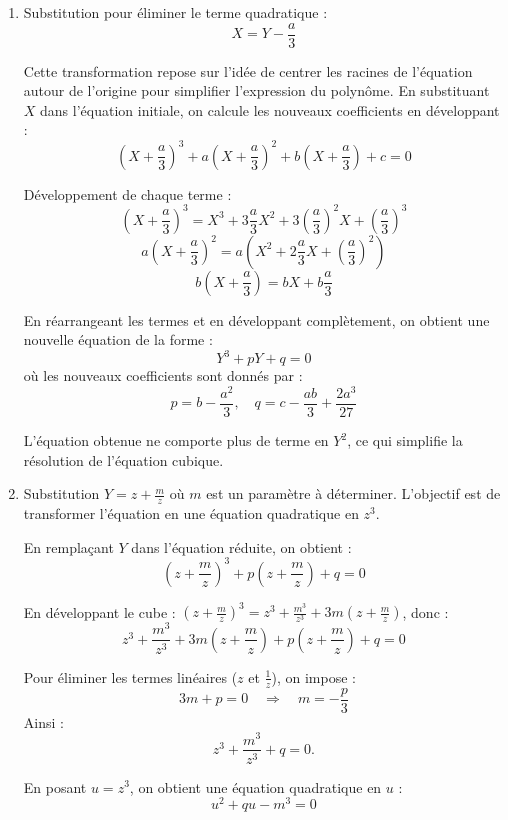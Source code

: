 \documentclass[10pt,a4paper]{article}
\begin{document}
\begin{enumerate}
    \item Substitution pour éliminer le terme quadratique :
    \[
    X = Y - \frac{a}{3}
    \]

    Cette transformation repose sur l'idée de centrer les racines de l'équation autour de l'origine
    pour simplifier l'expression du polynôme. En substituant \( X \) dans l'équation initiale, on
    calcule les nouveaux coefficients en développant :
    \[
    \left(X + \frac{a}{3}\right)^3 + a\left(X + \frac{a}{3}\right)^2 + b\left(X + \frac{a}{3}\right) + c = 0
    \]

    Développement de chaque terme :
    \[
    \left(X + \frac{a}{3}\right)^3 = X^3 + 3 \frac{a}{3} X^2 + 3 \left(\frac{a}{3}\right)^2 X + \left(\frac{a}{3}\right)^3
    \]
    \[
    a \left(X + \frac{a}{3}\right)^2 = a \left(X^2 + 2 \frac{a}{3} X + \left(\frac{a}{3}\right)^2 \right)
    \]
    \[
    b \left(X + \frac{a}{3}\right) = bX + b \frac{a}{3}
    \]

    En réarrangeant les termes et en développant complètement, on obtient une nouvelle équation de
    la forme :
    \[
    Y^3 + pY + q = 0
    \]
    où les nouveaux coefficients sont donnés par :
    \[
    p = b - \frac{a^2}{3}, \quad q = c - \frac{ab}{3} + \frac{2a^3}{27}
    \]

    L'équation obtenue ne comporte plus de terme en \( Y^2 \), ce qui simplifie la résolution de
    l'équation cubique.

    \item Substitution \( Y = z + \frac{m}{z} \) où \( m \) est un paramètre à déterminer.
    L'objectif est de transformer l'équation en une équation quadratique en \( z^3 \).

    En remplaçant \( Y \) dans l'équation réduite, on obtient :
    \[
    \left(z + \frac{m}{z}\right)^3 + p\left(z + \frac{m}{z}\right) + q = 0
    \]

    En développant le cube : $\left(z + \frac{m}{z}\right)^3 = z^3 + \frac{m^3}{z^3} + 3m\left(z +
    \frac{m}{z}\right)$, donc :
    \[
      z^3 + \frac{m^3}{z^3} + 3m\left(z + \frac{m}{z}\right) + p\left(z + \frac{m}{z}\right) + q = 0
    \]

    Pour éliminer les termes linéaires ($z$ et $\frac{1}{z}$), on impose :
    $$
    3m + p = 0 \quad \Rightarrow \quad m = -\frac{p}{3}
    $$
    Ainsi :
    \[
    z^3 + \frac{m^3}{z^3} + q = 0.
    \]

    En posant \( u = z^3 \), on obtient une équation quadratique en \( u \) :
    \[
    u^2 + qu - m^3 = 0
    \]


\end{enumerate}
\end{document}
